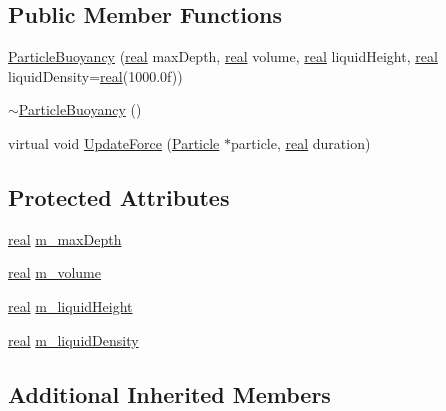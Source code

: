 \subsection*{Public Member Functions}
\begin{DoxyCompactItemize}
\item 
\hyperlink{classrum_1_1_particle_buoyancy_a25df269bba530e8275ee0e22e9fce166}{Particle\+Buoyancy} (\hyperlink{namespacerum_a7e8cca23573d5eaead0f138cbaa4862c}{real} max\+Depth, \hyperlink{namespacerum_a7e8cca23573d5eaead0f138cbaa4862c}{real} volume, \hyperlink{namespacerum_a7e8cca23573d5eaead0f138cbaa4862c}{real} liquid\+Height, \hyperlink{namespacerum_a7e8cca23573d5eaead0f138cbaa4862c}{real} liquid\+Density=\hyperlink{namespacerum_a7e8cca23573d5eaead0f138cbaa4862c}{real}(1000.\+0f))
\item 
\hyperlink{classrum_1_1_particle_buoyancy_a892e6f064e5eb1be8e7d2af8c76b856c}{$\sim$\+Particle\+Buoyancy} ()
\item 
virtual void \hyperlink{classrum_1_1_particle_buoyancy_aeda5d90f9ac512fdf63079739b9af0b7}{Update\+Force} (\hyperlink{classrum_1_1_particle}{Particle} $\ast$particle, \hyperlink{namespacerum_a7e8cca23573d5eaead0f138cbaa4862c}{real} duration)
\end{DoxyCompactItemize}
\subsection*{Protected Attributes}
\begin{DoxyCompactItemize}
\item 
\hyperlink{namespacerum_a7e8cca23573d5eaead0f138cbaa4862c}{real} \hyperlink{classrum_1_1_particle_buoyancy_af29f25245a785fc1bceafeac08728370}{m\+\_\+max\+Depth}
\item 
\hyperlink{namespacerum_a7e8cca23573d5eaead0f138cbaa4862c}{real} \hyperlink{classrum_1_1_particle_buoyancy_acb0a75c58de8ddede0b4be9939917c32}{m\+\_\+volume}
\item 
\hyperlink{namespacerum_a7e8cca23573d5eaead0f138cbaa4862c}{real} \hyperlink{classrum_1_1_particle_buoyancy_a220309bad493fc0d090bd3e91d9f4acb}{m\+\_\+liquid\+Height}
\item 
\hyperlink{namespacerum_a7e8cca23573d5eaead0f138cbaa4862c}{real} \hyperlink{classrum_1_1_particle_buoyancy_a8e347c9390d2eb5e4340f6e3c9d8d332}{m\+\_\+liquid\+Density}
\end{DoxyCompactItemize}
\subsection*{Additional Inherited Members}


